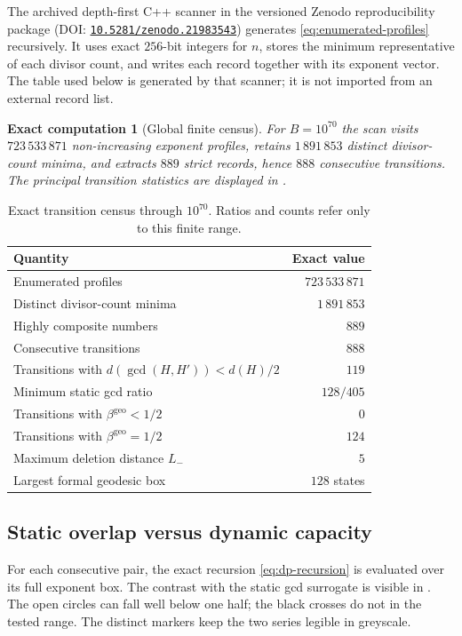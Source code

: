 \documentclass[11pt]{article}
\numberwithin{equation}{section}
\theoremstyle{blueplain}
\theoremstyle{bluedef}
\newtheorem{computation}[theorem]{Exact computation}
\newcommand{\betageo}{\beta^{\mathrm{geo}}}
\newcommand{\zenododoi}{\href{https://doi.org/10.5281/zenodo.21983543}{\nolinkurl{10.5281/zenodo.21983543}}}
\begin{document}
 The archived depth-first C++ scanner in the versioned Zenodo reproducibility package (DOI: \zenododoi) generates \eqref{eq:enumerated-profiles} recursively.  It uses exact $256$-bit integers for $n$, stores the minimum representative of each divisor count, and writes each record together with its exponent vector.  The table used below is generated by that scanner; it is not imported from an external record list.

\begin{computation}[Global finite census]
\label{comp:global-census}
For $B=10^{70}$ the scan visits $723\,533\,871$ non-increasing exponent profiles, retains $1\,891\,853$ distinct divisor-count minima, and extracts $889$ strict records, hence $888$ consecutive transitions.  The principal transition statistics are displayed in .
\end{computation}

\begin{table}[t]
\centering
\caption{Exact transition census through $10^{70}$.  Ratios and counts refer only to this finite range.}
\label{tab:global-census}
\begin{tabularx}{0.92\textwidth}{@{}Xr@{}}
\toprule
Quantity & Exact value\\
\midrule
Enumerated profiles & $723\,533\,871$\\
Distinct divisor-count minima & $1\,891\,853$\\
Highly composite numbers & $889$\\
Consecutive transitions & $888$\\
Transitions with $d(\gcd(H,H'))<d(H)/2$ & $119$\\
Minimum static gcd ratio & $128/405$\\
Transitions with $\betageo<1/2$ & $0$\\
Transitions with $\betageo=1/2$ & $124$\\
Maximum deletion distance $L_-$ & $5$\\
Largest formal geodesic box & $128$ states\\
\bottomrule
\end{tabularx}
\end{table}

\subsection{Static overlap versus dynamic capacity}

For each consecutive pair, the exact recursion \eqref{eq:dp-recursion} is evaluated over its full exponent box.  The contrast with the static gcd surrogate is visible in .  The open circles can fall well below one half; the black crosses do not in the tested range.  The distinct markers keep the two series legible in greyscale.
\end{document}
